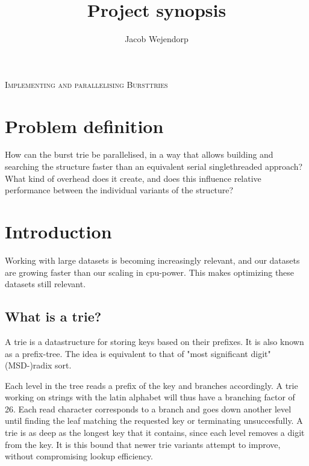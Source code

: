 \documentclass[a4paper, oneside, draft]{memoir}
\title{Project synopsis\\\projecttitle}
\author{Jacob Wejendorp}
\newcommand{\projecttitle}{Implementing and parallelising Bursttries}
\newcommand{\bigname}[1]{
        \begin{center}\fontfamily{phv}\selectfont\large\scshape#1\end{center}
}
\begin{document}
\maketitle


\clearpage


\bigname{\projecttitle}

\section{Problem definition}
How can the burst trie be parallelised, in a way that allows building and searching
the structure faster than an equivalent serial singlethreaded approach?
What kind of overhead does it create, and does this influence relative
performance between the individual variants of the structure?


\section{Introduction}
Working with large datasets is becoming increasingly relevant, and our
datasets are growing faster than our scaling in cpu-power. This makes optimizing
these datasets still relevant.

\subsection{What is a trie?}
A trie is a datastructure for storing keys based on their prefixes.
It is also known as a prefix-tree. The idea is equivalent to that of
"most significant digit" (MSD-)radix sort.

Each level in the tree reads a prefix of the key and branches accordingly.
A trie working on strings with the latin alphabet will thus have a branching
factor of 26. Each read character corresponds to a branch and goes down another
level until finding the leaf matching the requested key or terminating
unsuccesfully. A trie is as deep as the longest key that it contains, since
each level removes a digit from the key. It is this bound that newer trie
variants attempt to improve, without compromising lookup efficiency.
\end{document}
